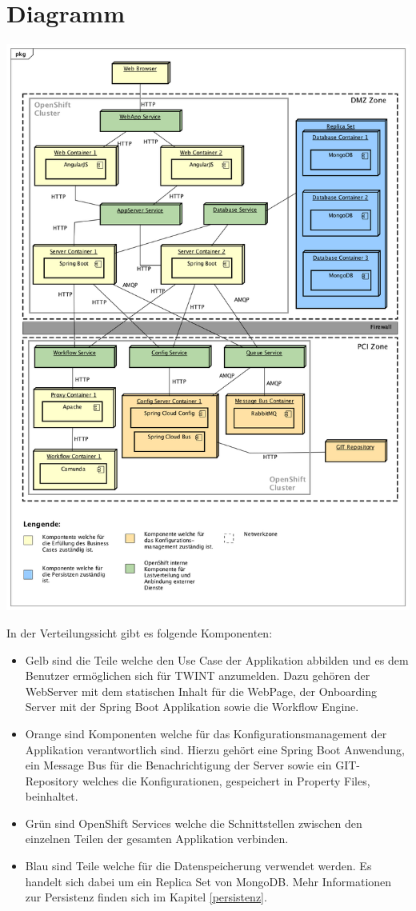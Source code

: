 \section{Diagramm}
\label{deploy-dia}
\begin{center}
	\includegraphics[scale=0.46]{OpenShiftDeployment.png}
\end{center}
\newpage
In der Verteilungssicht gibt es folgende Komponenten:\newline
\begin{itemize}
	\item Gelb sind die Teile welche den Use Case der Applikation abbilden und es dem Benutzer ermöglichen sich für TWINT anzumelden. Dazu gehören der WebServer mit dem statischen Inhalt für die WebPage, der Onboarding Server mit der Spring Boot Applikation sowie die Workflow Engine.
	\item Orange sind Komponenten welche für das Konfigurationsmanagement der Applikation verantwortlich sind. Hierzu gehört eine Spring Boot Anwendung, ein Message Bus für die Benachrichtigung der Server sowie ein GIT-Repository welches die Konfigurationen, gespeichert in Property Files, beinhaltet.
	\item Grün sind OpenShift Services welche die Schnittstellen zwischen den einzelnen Teilen der gesamten Applikation verbinden.
	\item Blau sind Teile welche für die Datenspeicherung verwendet werden. Es handelt sich dabei um ein Replica Set von MongoDB. Mehr Informationen zur Persistenz finden sich im Kapitel \ref{persistenz}.
\end{itemize}


